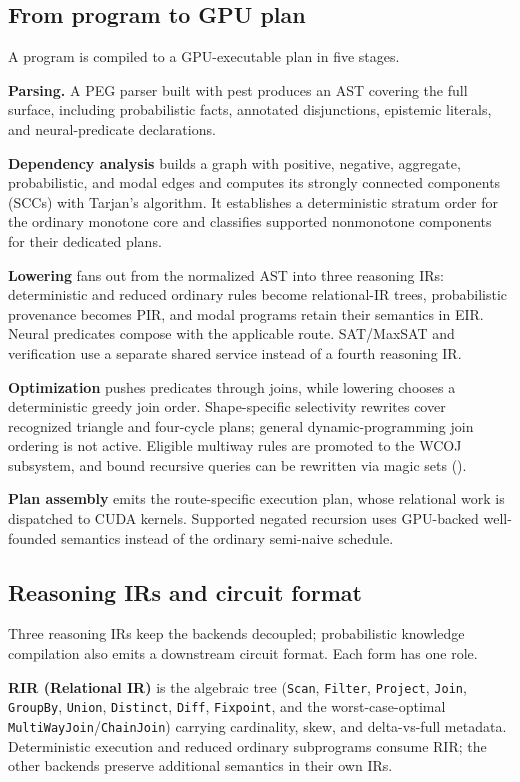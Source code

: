 \subsection{From program to GPU plan}

A program is compiled to a GPU-executable plan in five stages.

\textbf{Parsing.} A PEG parser built with pest produces an AST covering the full surface, including probabilistic facts, annotated disjunctions, epistemic literals, and neural-predicate declarations.

\textbf{Dependency analysis} builds a graph with positive, negative, aggregate, probabilistic, and modal edges and computes its strongly connected components (SCCs) with Tarjan's algorithm. It establishes a deterministic stratum order for the ordinary monotone core and classifies supported nonmonotone components for their dedicated plans.

\textbf{Lowering} fans out from the normalized AST into three reasoning IRs: deterministic and reduced ordinary rules become relational-IR trees, probabilistic provenance becomes PIR, and modal programs retain their semantics in EIR. Neural predicates compose with the applicable route. SAT/MaxSAT and verification use a separate shared service instead of a fourth reasoning IR.

\textbf{Optimization} pushes predicates through joins, while lowering chooses a deterministic greedy join order. Shape-specific selectivity rewrites cover recognized triangle and four-cycle plans; general dynamic-programming join ordering is not active. Eligible multiway rules are promoted to the WCOJ subsystem, and bound recursive queries can be rewritten via magic sets ().

\textbf{Plan assembly} emits the route-specific execution plan, whose relational work is dispatched to CUDA kernels. Supported negated recursion uses GPU-backed well-founded semantics instead of the ordinary semi-naive schedule.

\subsection{Reasoning IRs and circuit format}

Three reasoning IRs keep the backends decoupled; probabilistic knowledge compilation also emits a downstream circuit format. Each form has one role.

\textbf{RIR (Relational IR)} is the algebraic tree (\texttt{Scan}, \texttt{Filter}, \texttt{Project}, \texttt{Join}, \texttt{GroupBy}, \texttt{Union}, \texttt{Distinct}, \texttt{Diff}, \texttt{Fixpoint}, and the worst-case-optimal \texttt{MultiWayJoin}/\texttt{ChainJoin}) carrying cardinality, skew, and delta-vs-full metadata. Deterministic execution and reduced ordinary subprograms consume RIR; the other backends preserve additional semantics in their own IRs.

